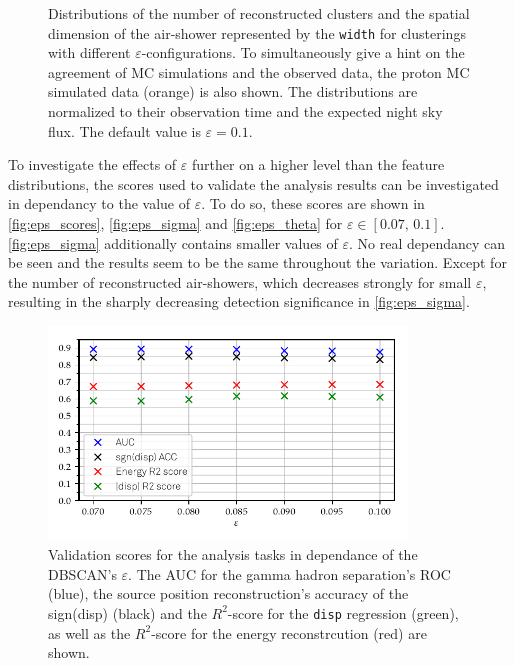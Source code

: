\begin{figure}
\begin{subfigure}{0.5\textwidth}
  \end{subfigure}
  \caption{Distributions of the number of reconstructed
  clusters and the spatial dimension of the air-shower represented by the
  \texttt{width} for clusterings with different $\varepsilon$-configurations. To simultaneously give a hint on the agreement of MC simulations and the observed data, the proton MC simulated data (orange) is also shown. The distributions are normalized to their observation time and the expected night sky flux. The default value is $\varepsilon = 0.1$.}
  \label{fig:eps_feat3}
\end{figure}
%
To investigate the effects of $\varepsilon$ further on a higher level than the
feature distributions, the scores used to validate the analysis results can be
investigated in dependancy to the value of $\varepsilon$. To do so, these
scores are shown in \autoref{fig:eps_scores}, \ref{fig:eps_sigma} and
\ref{fig:eps_theta} for $\varepsilon \in [0.07,\,0.1]$. \autoref{fig:eps_sigma}
additionally contains smaller values of $\varepsilon$. No real dependancy can
be seen and the results seem to be the same throughout the variation. Except
for the number of reconstructed air-showers, which decreases strongly for small
$\varepsilon$, resulting in the sharply decreasing detection significance in
\autoref{fig:eps_sigma}.
%
\begin{figure}
  \centering
  \includegraphics[width=0.85\textwidth]{Plots/Epsilon/eps_scores.pdf}
  \caption{Validation scores for the analysis tasks in dependance of the DBSCAN's $\varepsilon$. The AUC for the gamma hadron separation's ROC (blue), the source position reconstruction's accuracy of the sign(disp) (black) and the $R^2$-score for the \texttt{disp} regression (green), as well as the $R^2$-score for the energy reconstrcution (red) are shown.}
  \label{fig:eps_scores}
\end{figure}
